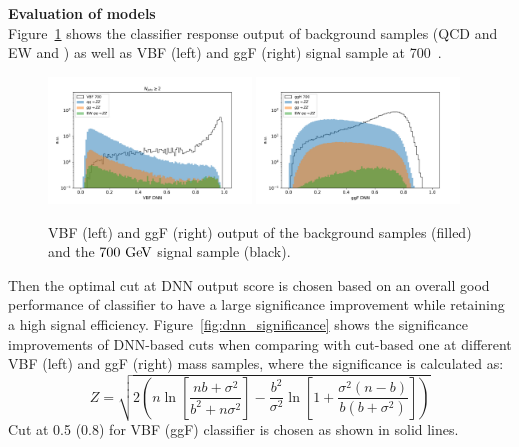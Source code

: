 \textbf{Evaluation of models} \\
Figure~\ref{fig:dnn_output_score} shows the classifier response output of background samples (QCD and EW \qqZZ and \ggZZ) as well as VBF (left) and ggF (right) signal sample at 700~\gev.

\begin{figure}[htbp]
        \includegraphics[width=0.48\textwidth]{figures/HMHZZ/selection/vbf_input/clf_output.pdf}
        \includegraphics[width=0.48\textwidth]{figures/HMHZZ/selection/ggf_input/clf_output.pdf}
        \centering
        \caption{VBF (left) and ggF (right) output of the background samples (filled) and the $700~\text{Ge\kern -0.1em V}$ signal sample (black).}
        \label{fig:dnn_output_score}
\end{figure}

Then the optimal cut at DNN output score is chosen based on an overall good performance of classifier to have a large significance improvement while retaining a high signal efficiency.
Figure~\ref{fig:dnn_significance} shows the significance improvements of DNN-based cuts when comparing with cut-based one at different VBF (left) and ggF (right) mass samples,
where the significance is calculated as:
\begin{equation}
Z = \sqrt{2\left(n\ln \left[ \frac{nb+\sigma^2}{b^2+n\sigma^2}\right]
        - \frac{b^2}{\sigma^2}\ln\left[1+\frac{\sigma^2(n-b)}{b(b+\sigma^2)}\right]\right)}
\end{equation}
Cut at 0.5 (0.8) for VBF (ggF) classifier is chosen as shown in solid lines.

